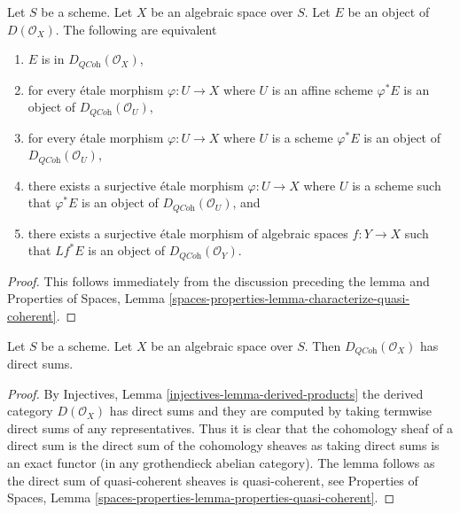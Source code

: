 \begin{lemma}
\label{lemma-check-quasi-coherence-on-covering}
Let $S$ be a scheme. Let $X$ be an algebraic space over $S$.
Let $E$ be an object of $D(\mathcal{O}_X)$. The following are equivalent
\begin{enumerate}
\item $E$ is in $D_{\textit{QCoh}}(\mathcal{O}_X)$,
\item for every \'etale morphism $\varphi : U \to X$ where $U$ is an
affine scheme $\varphi^*E$ is an object of
$D_{\textit{QCoh}}(\mathcal{O}_U)$,
\item for every \'etale morphism $\varphi : U \to X$ where $U$ is a scheme
$\varphi^*E$ is an object of
$D_{\textit{QCoh}}(\mathcal{O}_U)$,
\item there exists a surjective \'etale morphism $\varphi : U \to X$
where $U$ is a scheme such that $\varphi^*E$ is an object of
$D_{\textit{QCoh}}(\mathcal{O}_U)$, and
\item there exists a surjective \'etale morphism of algebraic spaces
$f : Y \to X$ such that $Lf^*E$ is an object of
$D_{\textit{QCoh}}(\mathcal{O}_Y)$.
\end{enumerate}
\end{lemma}

\begin{proof}
This follows immediately from the discussion preceding the lemma and
Properties of Spaces, Lemma
\ref{spaces-properties-lemma-characterize-quasi-coherent}.
\end{proof}

\begin{lemma}
\label{lemma-quasi-coherence-direct-sums}
Let $S$ be a scheme. Let $X$ be an algebraic space over $S$.
Then $D_{\textit{QCoh}}(\mathcal{O}_X)$ has direct sums.
\end{lemma}

\begin{proof}
By Injectives, Lemma \ref{injectives-lemma-derived-products}
the derived category $D(\mathcal{O}_X)$ has direct sums and
they are computed by taking termwise direct sums of any representatives.
Thus it is clear that the cohomology sheaf of a direct sum is the
direct sum of the cohomology sheaves as taking direct sums is
an exact functor (in any grothendieck abelian category). The lemma
follows as the direct sum of quasi-coherent sheaves is quasi-coherent, see
Properties of Spaces, Lemma
\ref{spaces-properties-lemma-properties-quasi-coherent}.
\end{proof}

